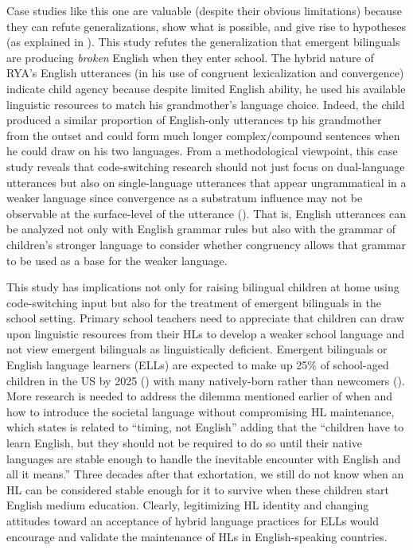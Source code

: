 \documentclass[output=paper,colorlinks,citecolor=brown]{langscibook}
\begin{document}
Case studies like this one are valuable (despite their obvious limitations) because they can refute generalizations, show what is possible, and give rise to hypotheses (as explained in \citealt{DeucharQuay2001}). This study refutes the generalization that emergent bilinguals are producing \textit{broken} English when they enter school. The hybrid nature of RYA’s English utterances (in his use of congruent lexicalization and convergence) indicate child agency because despite limited English ability, he used his available linguistic resources to match his grandmother’s language choice. Indeed, the child produced a similar proportion of English-only utterances tp his grandmother from the outset and could form much longer complex/compound sentences when he could draw on his two languages. From a methodological viewpoint, this case study reveals that code-switching research should not just focus on dual-language utterances but also on single-language utterances that appear ungrammatical in a weaker language since convergence as a substratum influence may not be observable at the surface-level of the utterance (\citealt{BullockToribio2004}). That is, English utterances can be analyzed not only with English grammar rules but also with the grammar of children’s stronger language to consider whether congruency allows that grammar to be used as a base for the weaker language. 

This study has implications not only for raising bilingual children at home using code-switching input but also for the treatment of emergent bilinguals in the school setting. Primary school teachers need to appreciate that children can draw upon linguistic resources from their HLs to develop a weaker school language and not view emergent bilinguals as linguistically deficient. Emergent bilinguals or English language learners (ELLs) are expected to make up 25\% of school-aged children in the US by 2025 (\citealt{NationalEducationAssociation2020}) with many natively-born rather than newcomers (\citealt{ZongBatalova2015}). More research is needed to address the dilemma mentioned earlier of when and how to introduce the societal language without compromising HL maintenance, which  \citet[345]{WongFillmore1991} states is related to “timing, not English” adding that the “children have to learn English, but they should not be required to do so until their native languages are stable enough to handle the inevitable encounter with English and all it means.” Three decades after that exhortation, we still do not know when an HL can be considered stable enough for it to survive when these children start English medium education. Clearly, legitimizing HL identity and changing attitudes toward an acceptance of hybrid language practices for ELLs would encourage and validate the maintenance of HLs in English-speaking countries.
\end{document}
